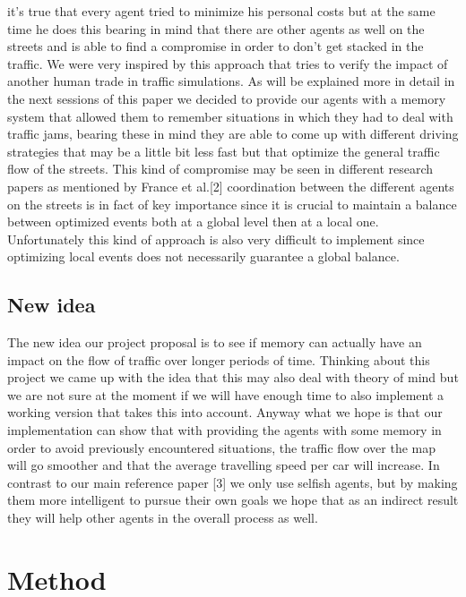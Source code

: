 \documentclass[a4paper,hidelinks]{article}
\begin{document}
it's true that every agent tried to minimize his personal costs but at the same time he does this bearing in mind that there are other agents as well on the streets and is able to find a compromise in order to don't get stacked in the traffic. We were very inspired by this approach that tries to verify the impact of another human trade in traffic simulations. As will be explained more in detail in the next sessions of this paper we decided to provide our agents with a memory system that allowed them to remember situations in which they had to deal with traffic jams, bearing these in mind they are able to come up with different driving strategies that may be a little bit less fast but that optimize the general traffic flow of the streets.
This kind of compromise may be seen in different research papers as mentioned by France et al.[2] coordination between the different agents on the streets is in fact of key importance since it is crucial to maintain a balance between optimized events both at a global level then at a local one. Unfortunately this kind of approach is also very difficult to implement since optimizing local events does not necessarily guarantee a global balance.         

\subsection{New idea}
The new idea our project proposal is to see if memory can actually have an impact on the flow of traffic over longer periods of time. Thinking about this project we came up with the idea that this may also deal with theory of mind but we are not sure at the moment if we will have enough time to also implement a working version that takes this into account. Anyway what we hope is that our implementation can show that with providing the agents with some memory in order to avoid previously encountered situations, the traffic flow over the map will go smoother and that the average travelling speed per car will increase. In contrast to our main reference paper [3] we only use selfish agents, but by making them more intelligent to pursue their own goals we hope that as an indirect result they will help other agents in the overall process as well.

\section{Method}
\end{document}
